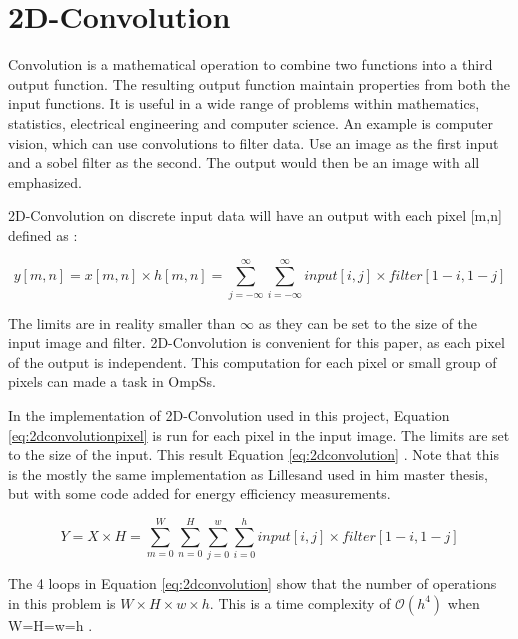 \section{2D-Convolution}
Convolution is a mathematical operation to combine two functions into a third output function.
The resulting output function maintain properties from both the input functions.
It is useful in a wide range of problems within mathematics, statistics, electrical engineering and computer science.
An example is computer vision, which can use convolutions to filter data.
Use an image as the first input and a sobel filter as the second.
The output would then be an image with all emphasized.

2D-Convolution on discrete input data will have an output with each pixel [m,n] defined as \cite{lillesand13}:

\begin{equation} \label{eq:2dconvolutionpixel}
  y[m,n] = x[m,n] \times h[m,n] = \sum\limits_{j=-\infty}^\infty \sum\limits_{i=-\infty}^\infty input[i,j] \times filter[1-i, 1-j]
\end{equation}

The limits are in reality smaller than $\infty$ as they can be set to the size of the input image and filter.
2D-Convolution is convenient for this paper, as each pixel of the output is independent.
This computation for each pixel or small group of pixels can made a task in OmpSs.

In the implementation of 2D-Convolution used in this project, Equation \ref{eq:2dconvolutionpixel} is run for each pixel in the input image.
The limits are set to the size of the input.
This result Equation \ref{eq:2dconvolution} \cite{lillesand13}.
Note that this is the mostly the same implementation as Lillesand used in him master thesis, but with some code added for energy efficiency measurements.

\begin{equation} \label{eq:2dconvolution}
  Y = X \times H = \sum\limits_{m=0}^W \sum\limits_{n=0}^H \sum\limits_{j=0}^{w} \sum\limits_{i=0}^{h} input[i,j] \times filter[1-i, 1-j]
\end{equation}

The 4 loops in Equation \ref{eq:2dconvolution} show that the number of operations in this problem is $W\times H\times w\times h$.
This is a time complexity of $\mathcal{O}(h^4)$ when W=H=w=h \cite{burger09}.

